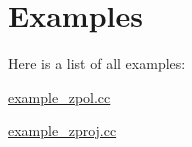 \section{Examples}
Here is a list of all examples:\begin{DoxyCompactItemize}
\item 
\hyperlink{example_zpol_8cc-example}{example\_\-zpol.cc}
\item 
\hyperlink{example_zproj_8cc-example}{example\_\-zproj.cc}
\end{DoxyCompactItemize}
